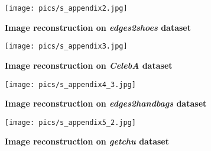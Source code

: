 \documentclass[10pt,twocolumn,letterpaper]{article} \usepackage{amsfonts,amssymb}
\begin{document}
\begin{figure*}[t]
\centering



\texttt{[image: pics/s\_appendix2.jpg]}

\caption{\textbf{Image reconstruction on \emph{edges2shoes} dataset}}
\label{future}
\end{figure*}
\begin{figure*}[t]
\centering



\texttt{[image: pics/s\_appendix3.jpg]}

\caption{\textbf{Image reconstruction on \emph{CelebA} dataset}}
\label{future}
\end{figure*}
\begin{figure*}[t]
\centering



\texttt{[image: pics/s\_appendix4\_3.jpg]}

\caption{\textbf{Image reconstruction on \emph{edges2handbags} dataset}}
\label{future}
\end{figure*}
\begin{figure*}[t]
\centering



\texttt{[image: pics/s\_appendix5\_2.jpg]}

\caption{\textbf{Image reconstruction on \emph{getchu} dataset}}
\label{future}
\end{figure*}
\end{document}
